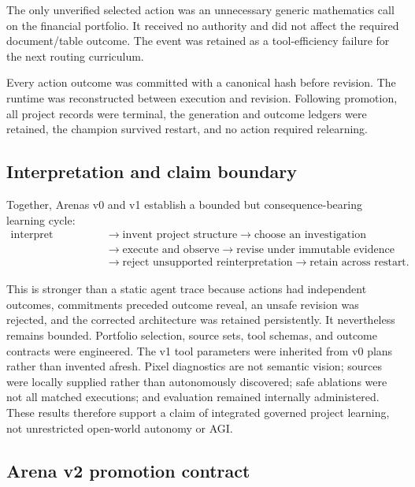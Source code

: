The only unverified selected action was an unnecessary generic mathematics call
on the financial portfolio.  It received no authority and did not affect the
required document/table outcome.  The event was retained as a tool-efficiency
failure for the next routing curriculum.

Every action outcome was committed with a canonical hash before revision.  The
runtime was reconstructed between execution and revision.  Following promotion,
all project records were terminal, the generation and outcome ledgers were
retained, the champion survived restart, and no action required relearning.


\subsection{Interpretation and claim boundary}
\label{subsec:arena-v1-boundary}

Together, Arenas v0 and v1 establish a bounded but consequence-bearing learning
cycle:
\begin{equation}
\begin{split}
\text{interpret objective}
&\rightarrow \text{invent project structure}
\rightarrow \text{choose an investigation} \\
&\rightarrow \text{execute and observe}
\rightarrow \text{revise under immutable evidence} \\
&\rightarrow \text{reject unsupported reinterpretation}
\rightarrow \text{retain across restart}.
\end{split}
\label{eq:arena-learning-cycle}
\end{equation}

This is stronger than a static agent trace because actions had independent
outcomes, commitments preceded outcome reveal, an unsafe revision was rejected,
and the corrected architecture was retained persistently.  It nevertheless
remains bounded.  Portfolio selection, source sets, tool schemas, and outcome
contracts were engineered.  The v1 tool parameters were inherited from v0
plans rather than invented afresh.  Pixel diagnostics are not semantic vision;
sources were locally supplied rather than autonomously discovered; safe
ablations were not all matched executions; and evaluation remained internally
administered.  These results therefore support a claim of integrated governed
project learning, not unrestricted open-world autonomy or AGI.


\subsection{Arena v2 promotion contract}
\label{subsec:arena-v2-contract}

